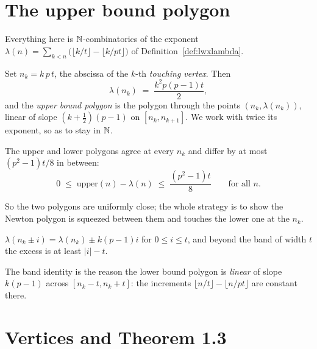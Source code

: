 \section{The upper bound polygon}

Everything here is $\mathbb{N}$-combinatorics of the exponent
$\lambda(n) = \sum_{k<n}\bigl(\lfloor k/t\rfloor - \lfloor k/pt\rfloor\bigr)$ of
Definition~\ref{def:lwxlambda}.

\begin{definition}
  \label{def:touchx}
  \leanok
  Set $n_k = k\,p\,t$, the abscissa of the $k$-th \emph{touching vertex}.  Then
  \cite[(3.23.1)]{LWX}
  \[
    \lambda(n_k) \;=\; \frac{k^{2}p(p-1)t}{2},
  \]
  and the \emph{upper bound polygon} is the polygon through the points $(n_k, \lambda(n_k))$,
  linear of slope $(k+\tfrac12)(p-1)$ on $[n_k, n_{k+1}]$.  We work with twice its exponent, so
  as to stay in $\mathbb{N}$.
\end{definition}

\begin{lemma}
  \label{lem:lwx41}
  \leanok
  The upper and lower polygons agree at every $n_k$ and differ by at most
  $(p^{2}-1)t/8$ in between:
  \[
    0 \;\leq\; \mathrm{upper}(n) - \lambda(n) \;\leq\; \frac{(p^{2}-1)t}{8}
    \qquad\text{for all } n .
  \]
\end{lemma}

So the two polygons are uniformly close; the whole strategy is to show the Newton polygon is
squeezed between them and touches the lower one at the $n_k$.

\begin{lemma}
  \label{lem:band}
  \leanok
  $\lambda(n_k\pm i) = \lambda(n_k) \pm k(p-1)i$ for $0\leq i\leq t$, and beyond the band of
  width $t$ the excess is at least $\lvert i\rvert - t$.
\end{lemma}

The band identity is the reason the lower bound polygon is \emph{linear} of slope $k(p-1)$ across
$[n_k-t, n_k+t]$: the increments $\lfloor n/t\rfloor - \lfloor n/pt\rfloor$ are constant there.

\section{Vertices and Theorem 1.3}

